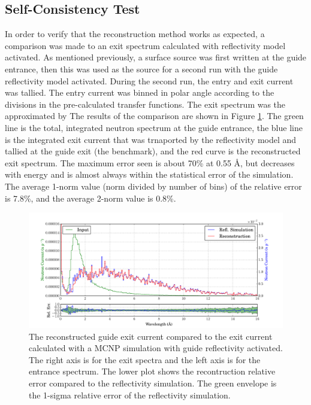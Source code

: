 \documentclass[a4paper]{jpconf}
\begin{document}
\subsection{Self-Consistency Test}

In order to verify that the reconstruction method works as expected, a comparison was made to an exit spectrum calculated with reflectivity model activated.  As mentioned previously, a surface source was first written at the guide entrance, then this was used as the source for a second run with the guide reflectivity model activated.  During the second run, the entry and exit current was tallied.  The entry current was binned in polar angle according to the divisions in the pre-calculated transfer functions.  The exit spectrum was the approximated by   The results of the comparison are shown in Figure \ref{xfer_bench}.  The green line is the total, integrated neutron spectrum at the guide entrance, the blue line is the integrated exit current that was trnaported by the reflectivity model and tallied at the guide exit (the benchmark), and the red curve is the reconstructed exit spectrum.  The maximum error seen is about 70\% at 0.55 \AA{}, but decreases with energy and is almost always within the statistical error of the simulation.  The average 1-norm value (norm divided by number of bins) of the relative error is 7.8\%, and the average 2-norm value is 0.8\%.

\begin{figure}
\begin{center}
\includegraphics[scale=0.5]{graphics/xfer_bench.pdf}
\end{center}
\caption{\label{xfer_bench}The reconstructed guide exit current compared to the exit current calculated with a MCNP simulation with guide reflectivity activated.  The right axis is for the exit spectra and the left axis is for the entrance spectrum.  The lower plot shows the recontruction relative error compared to the reflectivity simulation.  The green envelope is the 1-sigma relative error of the reflectivity simulation.}
\end{figure}
\end{document}
